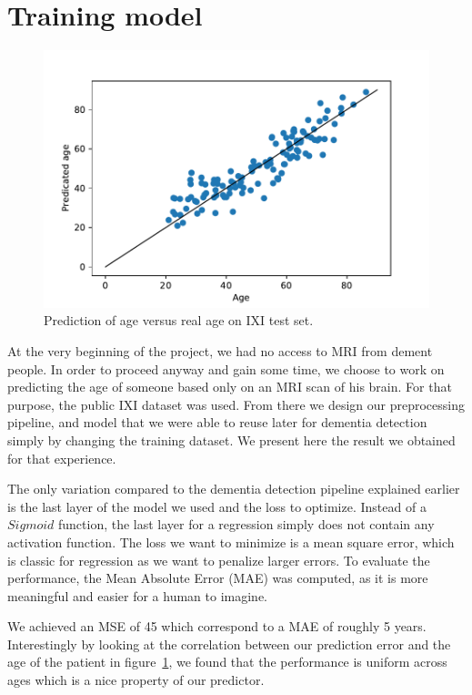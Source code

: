 \section{Training model}

\begin{figure}
 \centering
 \includegraphics[width=.9\linewidth]{figures/Age_pred_vs_age_IXI.pdf}
 \captionsetup{width=.9\linewidth}
 \caption{Prediction of age versus real age on IXI test set.}
 \label{fig:IXI_pred_vs_age}
\end{figure}

At the very beginning of the project, we had no access to MRI from dement people. In order to proceed anyway and gain some time, we choose to work on predicting the age of someone based only on an MRI scan of his brain. For that purpose, the public IXI dataset was used. From there we design our preprocessing pipeline, and model that we were able to reuse later for dementia detection simply by changing the training dataset. We present here the result we obtained for that experience.

The only variation compared to the dementia detection pipeline explained earlier is the last layer of the model we used and the loss to optimize. Instead of a $Sigmoid$ function, the last layer for a regression simply does not contain any activation function. The loss we want to minimize is a mean square error, which is classic for regression as we want to penalize larger errors. To evaluate the performance, the Mean Absolute Error (MAE) was computed, as it is more meaningful and easier for a human to imagine.


We achieved an MSE of 45 which correspond to a MAE of roughly 5 years. Interestingly by looking at the correlation between our prediction error and the age of the patient in figure~\ref{fig:IXI_pred_vs_age}, we found that the performance is uniform across ages which is a nice property of our predictor.

